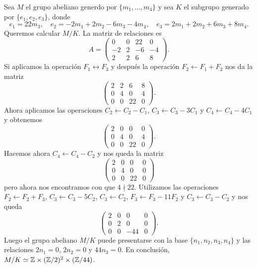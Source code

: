 \begin{example}
Sea $M$ el grupo abeliano generdo por $\{m_1,\dots,m_4\}$ y sea $K$ el subgrupo
generado por $\{e_1,e_2,e_3\}$, donde
\[
e_1=22m_3,\quad
e_2=-2m_1+2m_2-6m_3-4m_4,\quad
e_3=2m_1+2m_2+6m_3+8m_4.
\]
Queremos calcular $M/K$. 
La matriz de relaciones es 
\[
A=\begin{pmatrix}
	0 & 0 & 22 & 0\\
	-2 & 2 & -6 & -4\\
	2 & 2 & 6 & 8
\end{pmatrix}.
\]
Si aplicamos la operación $F_1\leftrightarrow F_3$ y después la operación $F_2\leftarrow F_1+F_2$ nos da la matriz
\[
\begin{pmatrix}
	2 & 2 & 6 & 8\\
	0 & 4 & 0 & 4\\
	0 & 0 & 22 & 0
\end{pmatrix}.
\]
Ahora aplicamos las operaciones $C_2\leftarrow C_2-C_1$, $C_3\leftarrow C_3-3C_1$ y $C_4\leftarrow C_4-4C_1$ y obtenemos
\[
\begin{pmatrix}
	2 & 0 & 0 & 0\\
	0 & 4 & 0 & 4\\
	0 & 0 & 22 & 0
\end{pmatrix}.
\]
Hacemos ahora $C_4\leftarrow C_4-C_2$ y nos queda la matriz
\[
\begin{pmatrix}
	2 & 0 & 0 & 0\\
	0 & 4 & 0 & 0\\
	0 & 0 & 22 & 0
\end{pmatrix}
\]
pero ahora nos encontramos con que $4\nmid 22$. Utilizamos las operaciones $F_2\leftarrow F_2+F_3$, $C_3\leftarrow C_3-5C_2$, $C_3\leftarrow C_2$, $F_3\leftarrow F_3-11F_2$ y 
$C_3\leftarrow C_3-C_2$ y nos queda
\[
\begin{pmatrix}
	2 & 0 & 0 & 0\\
	0 & 2 & 0 & 0\\
	0 & 0 & -44 & 0
\end{pmatrix}.
\]
Luego el grupo abeliano $M/K$ puede presentarse con la base $\{n_1,n_2,n_3,n_4\}$ y las relaciones
$2n_1=0$, $2n_2=0$ y $44n_3=0$. En conclusión, $M/K\simeq\mathbb{Z}\times (\mathbb{Z}/2)^2\times (\mathbb{Z}/44)$. 
\end{example}

